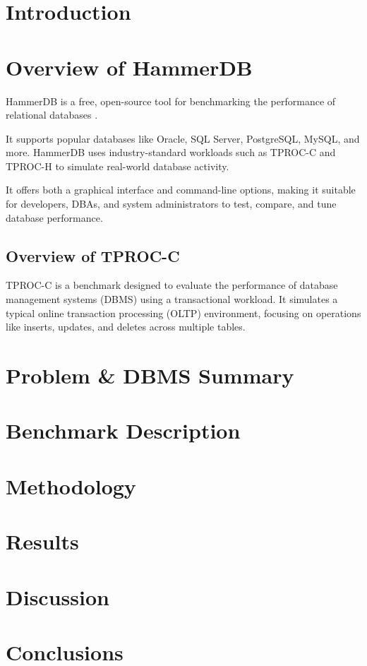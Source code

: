 
\section{Introduction}
\label{sec:intro}

\section{Overview of HammerDB}
\label{sec:hammerdb}

HammerDB is a free, open-source tool for benchmarking the performance of relational databases \cite{enwiki:1275860580}. 

It supports popular databases like Oracle, SQL Server, PostgreSQL, MySQL, and more. HammerDB uses industry-standard workloads such as TPROC-C and TPROC-H to simulate real-world database activity. 

It offers both a graphical interface and command-line options, making it suitable for developers, DBAs, and system administrators to test, compare, and tune database performance.

\subsection{Overview of TPROC-C}
\label{sec:tproc-c}

TPROC-C is a benchmark designed to evaluate the performance of database management systems (DBMS) using a transactional workload. It simulates a typical online transaction processing (OLTP) environment, focusing on operations like inserts, updates, and deletes across multiple tables.

\section{Problem \& DBMS Summary}
\label{sec:problem}

\section{Benchmark Description}
\label{sec:benchmark}

\section{Methodology}
\label{sec:methodology}

\section{Results}
\label{sec:results}

\section{Discussion}
\label{sec:discussion}

\section{Conclusions}
\label{sec:conclusions}
